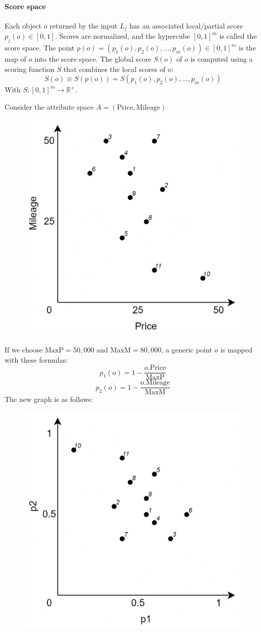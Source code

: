 \paragraph*{Score space}
Each object $o$ returned by the input $L_j$ has an associated local/partial score $p_j(o) \in [0,1]$. 
Scores are normalized, and the hypercube $[0,1]^m$ is called the score space.
The point $p(o) = (p_1(o), p_2(o), \dots, p_m(o)) \in [0,1]^m$ is the map of $o$ into the score space. 
The global score $S(o)$ of $o$ is computed using a scoring function $S$ that combines the local scores of $o$:
\[S(o) \equiv  S(p(o)) = S(p_1(o),p_2(o),\dots,p_m(o))\]
With $S:[0,1]^m \rightarrow \mathbb{R}^{+}$. 
\begin{example}
    Consider the attribute space $A = (\text{Price},\text{Mileage})$
    \begin{figure}[H]
        \centering
        \includegraphics[width=0.35\linewidth]{images/ex1.png}
    \end{figure}
    If we choose $\text{MaxP} = 50,000$ and $\text{MaxM} = 80,000$, a generic point $o$ is mapped with these formulas:
    \[p_1(o) = 1 - \dfrac{o.\text{Price}}{\text{MaxP}}\]
    \[p_2(o) = 1 - \dfrac{o.\text{Mileage}}{\text{MaxM}}\]
    The new graph is as follows: 
    \begin{figure}[H]
        \centering
        \includegraphics[width=0.35\linewidth]{images/ex2.png}
    \end{figure}
\end{example}

